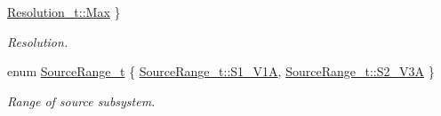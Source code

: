 \begin{DoxyCompactItemize}
\hyperlink{classmdt_device_u3606_a_a136af13281bde380abeabe358c399dc5a6a061313d22e51e0f25b7cd4dc065233}{Resolution\-\_\-t\-::\-Max}
 \}
\begin{DoxyCompactList}\small\item\em Resolution. \end{DoxyCompactList}\item 
enum \hyperlink{classmdt_device_u3606_a_a8fc404c35beec2cdb8c26f8709394a50}{Source\-Range\-\_\-t} \{ \hyperlink{classmdt_device_u3606_a_a8fc404c35beec2cdb8c26f8709394a50a374ff60a3cebd99cbcfa167d596fa9bf}{Source\-Range\-\_\-t\-::\-S1\-\_\-V1\-A}, 
\hyperlink{classmdt_device_u3606_a_a8fc404c35beec2cdb8c26f8709394a50adf004d6cd1d0d95c100c55e252d47d0d}{Source\-Range\-\_\-t\-::\-S2\-\_\-V3\-A}
 \}
\begin{DoxyCompactList}\small\item\em Range of source subsystem. \end{DoxyCompactList}\end{DoxyCompactItemize}
